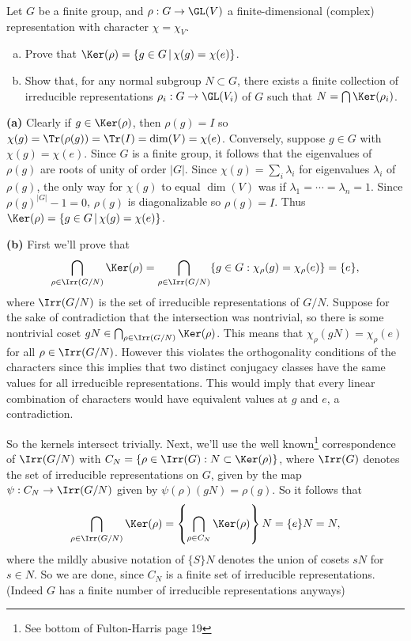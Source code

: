 \documentclass[11pt, letterpaper]{article}
\begin{document}
\pagebreak
\begin{problem}
    Let $G$ be a finite group, and $\rho: G\to \GL(V)$ a finite-dimensional (complex) representation with character $\chi=\chi_V$.
    \begin{enumerate}[(a)]
        \item Prove that $\Ker(\rho)=\{g\in G\,|\,\chi(g)=\chi(e)\}$.
        \item Show that, for any normal subgroup $N\subset G$, there exists a finite collection of irreducible representations $\rho_i:G\to \GL(V_i)$ of $G$ such that $N=\bigcap \Ker(\rho_i)$. 
    \end{enumerate} 
\end{problem}

\textbf{(a)} Clearly if $g\in\Ker(\rho)$, then $\rho(g)=I$ so $\chi(g)=\Tr(\rho(g))=\Tr(I)=\dim(V)=\chi(e)$. Conversely, suppose $g\in G$ with $\chi(g)=\chi(e)$. Since $G$ is a finite group, it follows that the eigenvalues of $\rho(g)$ are roots of unity of order $|G|$. Since $\chi(g)=\sum_i \lambda_i$ for eigenvalues $\lambda_i$ of $\rho(g)$, the only way for $\chi(g)$ to equal $\dim(V)$ was if $\lambda_1=\cdots=\lambda_n=1$. Since $\rho(g)^{|G|}-1=0$, $\rho(g)$ is diagonalizable so $\rho(g)=I$. Thus $\Ker(\rho)=\{g\in G\,|\, \chi(g)=\chi(e)\}$.

\textbf{(b)} First we'll prove that
\[
    \bigcap_{\rho\in \Irr(G/N)} \Ker(\rho) = \bigcap_{\rho\in \Irr(G/N)} \{g\in G : \chi_\rho(g)=\chi_\rho(e)\} = \{e\}
,\] 
where $\Irr(G/N)$ is the set of irreducible representations of $G/N$. Suppose for the sake of contradiction that the intersection was nontrivial, so there is some nontrivial coset $gN\in \bigcap_{\rho\in \Irr(G/N)} \Ker(\rho)$. This means that $\chi_\rho(gN)=\chi_\rho(e)$ for all $\rho\in \Irr(G/N)$. However this violates the orthogonality conditions of the characters since this implies that two distinct conjugacy classes have the same values for all irreducible representations. This would imply that every linear combination of characters would have equivalent values at $g$ and $e$, a contradiction. 

So the kernels intersect trivially. Next, we'll use the well known\footnote{See bottom of Fulton-Harris page 19} correspondence of $\Irr(G/N)$ with $C_N=\{ \rho \in \Irr(G) : N \subset \Ker(\rho) \}$, where $\Irr(G)$ denotes the set of irreducible representations on $G$, given by the map $\psi : C_N \to \Irr(G/N)$ given by $\psi(\rho)(gN) = \rho(g)$. So it follows that
\[
    \bigcap_{\rho\in \Irr(G/N)} \Ker(\rho) = \left\{\bigcap_{\rho\in C_N} \Ker(\rho)\right\}N = \{e\}N = N 
,\] 
where the mildly abusive notation of $\{S\}N$ denotes the union of cosets $sN$ for $s\in N$. So we are done, since $C_N$ is a finite set of irreducible representations. (Indeed $G$ has a finite number of irreducible representations anyways)
\end{document}
